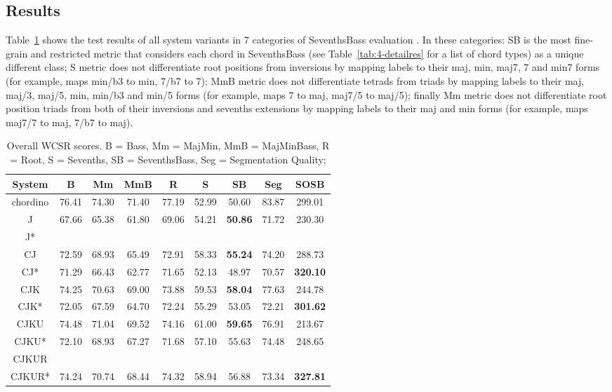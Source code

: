 \subsection{Results}
Table~\ref{tab:4-overallres} shows the test results of all system variants in 7 categories of SeventhsBass evaluation \cite{pauwels2013evaluating}. In these categories: SB is the most fine-grain and restricted metric that considers each chord in SeventhsBass (see Table~\ref{tab:4-detailres} for a list of chord types) as a unique different class; S metric does not differentiate root positions from inversions by mapping labels to their maj, min, maj7, 7 and min7 forms (for example, maps min/b3 to min, 7/b7 to 7); MmB metric does not differentiate tetrads from triads by mapping labels to their maj, maj/3, maj/5, min, min/b3 and min/5 forms (for example, maps 7 to maj, maj7/5 to maj/5); finally Mm metric does not differentiate root position triads from both of their inversions and sevenths extensions by mapping labels to their maj and min forms (for example, maps maj7/7 to maj, 7/b7 to maj).
\begin{table}[htb]
\caption{Overall WCSR scores. B = Bass, Mm = MajMin, MmB = MajMinBass, R = Root, S = Sevenths, SB = SeventhsBass, Seg = Segmentation Quality;}
\label{tab:4-overallres}
\centering
\begin{tabular}{|c|c|c|c|c|c|c|c|c|}\hline
System & B & Mm & MmB & R & S & SB & Seg & SOSB \\ \hline
chordino & 76.41 & 74.30 & 71.40 & 77.19 & 52.99 & 50.60 & 83.87 & 299.01\\ \hline
J& 67.66 & 65.38 & 61.80 & 69.06 & 54.21 & \textbf{50.86} & 71.72 & 230.30 \\ \hline
J* & & & & & & & & \\ \hline
CJ & 72.59 & 68.93 & 65.49 & 72.91 & 58.33 & \textbf{55.24} & 74.20 & 288.73 \\ \hline
CJ* & 71.29 & 66.43 & 62.77 & 71.65 & 52.13 & 48.97 & 70.57 & \textbf{320.10} \\ \hline
CJK & 74.25 & 70.63 & 69.00 & 73.88 & 59.53 & \textbf{58.04} & 77.63 & 244.78 \\ \hline
CJK* & 72.05 & 67.59 & 64.70 & 72.24 & 55.29 & 53.05 & 72.21& \textbf{301.62} \\ \hline
CJKU & 74.48 & 71.04 & 69.52 & 74.16 & 61.00 & \textbf{59.65} & 76.91 & 213.67 \\ \hline
CJKU* & 72.10 & 68.93 & 67.27 & 71.68 & 57.10 & 55.63 & 74.48 & 248.65 \\ \hline
CJKUR & & & & & & & & \\ \hline
CJKUR* & 74.24 & 70.74 & 68.44 & 74.32 & 58.94 & 56.88 & 73.34 & \textbf{327.81} \\ \hline
\end{tabular}
\end{table}

